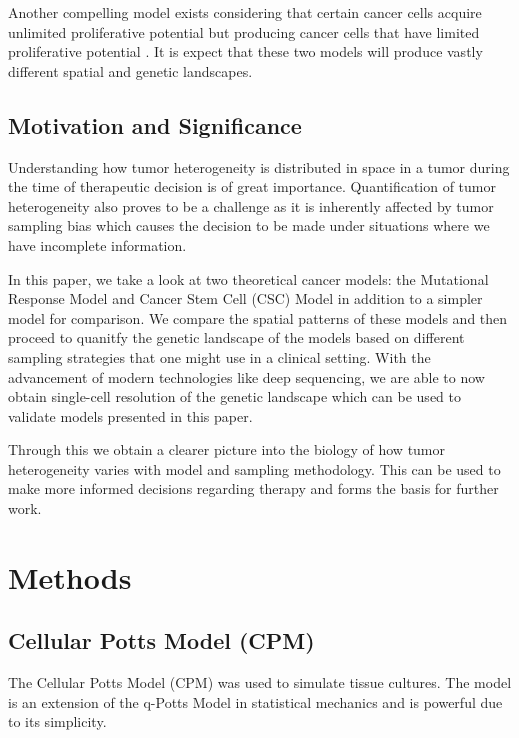 \documentclass[12pt]{article}
\begin{document}
Another compelling model exists considering that certain cancer cells acquire unlimited proliferative potential but producing cancer cells that have limited proliferative potential \cite{Tomasson2009}. It is expect that these two models will produce vastly different spatial and genetic landscapes.

\subsection{Motivation and Significance}
Understanding how tumor heterogeneity is distributed in space in a tumor during the time of therapeutic decision is of great importance. Quantification of tumor heterogeneity also proves to be a challenge as it is inherently affected by tumor sampling bias \cite{Heppner1983}\cite{Naxerova2015} which causes the decision to be made under situations where we have incomplete information. 

In this paper, we take a look at two theoretical cancer models: the Mutational Response Model and Cancer Stem Cell (CSC) Model in addition to a simpler model for comparison. We compare the spatial patterns of these models and then proceed to quanitfy the genetic landscape of the models based on different sampling strategies that one might use in a clinical setting. With the advancement of modern technologies like deep sequencing, we are able to now obtain single-cell resolution of the genetic landscape which can be used to validate models presented in this paper. 

Through this we obtain a clearer picture into the biology of how tumor heterogeneity varies with model and sampling methodology. This can be used to make more informed decisions regarding therapy and forms the basis for further work.


% 
% 

\section{Methods}
\subsection{Cellular Potts Model (CPM)}
The Cellular Potts Model (CPM) \cite{Graner1992} was used to simulate tissue cultures. The model is an extension of the q-Potts Model in statistical mechanics and is powerful due to its simplicity. 
\end{document}
